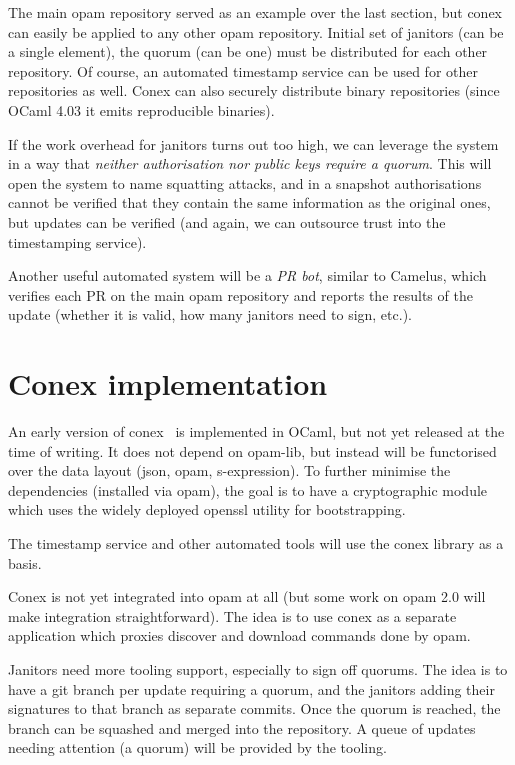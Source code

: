 \documentclass[nocopyrightspace]{sigplanconf}
\begin{document}
The main opam repository served as an example over the last section, but conex can easily be applied to any other opam repository.
Initial set of janitors (can be a single element), the quorum (can be one) must be distributed for each other repository.
Of course, an automated timestamp service can be used for other repositories as well.
Conex can also securely distribute binary repositories (since OCaml 4.03 it emits reproducible binaries).

If the work overhead for janitors turns out too high, we can leverage the system in a way that \emph{neither authorisation nor public keys require a quorum}.
This will open the system to name squatting attacks, and in a snapshot authorisations cannot be verified that they contain the same information as the original ones, but updates can be verified (and again, we can outsource trust into the timestamping service).

Another useful automated system will be a \emph{PR bot}, similar to Camelus, which verifies each PR on the main opam repository and reports the results of the update (whether it is valid, how many janitors need to sign, etc.).

\section{Conex implementation} \label{sec:implementation}
An early version of conex~\cite{conex} is implemented in OCaml, but not yet released at the time of writing.
It does not depend on opam-lib, but instead will be functorised over the data layout (json, opam, s-expression).
To further minimise the dependencies (installed via opam), the goal is to have a cryptographic module which uses the widely deployed openssl utility for bootstrapping.

The timestamp service and other automated tools will use the conex library as a basis.

Conex is not yet integrated into opam at all (but some work on opam 2.0 will make integration straightforward).
The idea is to use conex as a separate application which proxies discover and download commands done by opam.

Janitors need more tooling support, especially to sign off quorums.
The idea is to have a git branch per update requiring a quorum, and the janitors adding their signatures to that branch as separate commits.
Once the quorum is reached, the branch can be squashed and merged into the repository.
A queue of updates needing attention (a quorum) will be provided by the tooling.
\end{document}
